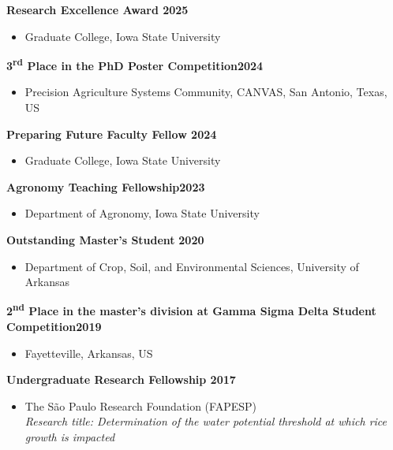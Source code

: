 \documentclass[letterpaper,10pt]{article}
\begin{document}
{\bf Research Excellence Award \hfill 2025}
\vspace{-.1in}
\begin{itemize}
\renewcommand\labelitemi{{\boldmath$\cdot$}}
\item Graduate College, Iowa State University
\end{itemize}

{\bf 3\textsuperscript{rd} Place in the PhD Poster
Competition}\hfill {\bf 2024} \vspace{-.1in}
\begin{itemize}
	\renewcommand\labelitemi{{\boldmath$\cdot$}}
	\item Precision Agriculture Systems
		Community, CANVAS, San Antonio,
		Texas, US 

\end{itemize}

{\bf Preparing Future Faculty Fellow \hfill 2024}
\vspace{-.1in}
\begin{itemize}
\renewcommand\labelitemi{{\boldmath$\cdot$}}
\item 
Graduate College,
Iowa State University
\end{itemize}

{\bf Agronomy Teaching Fellowship}\hfill {\bf 2023}
\vspace{-.1in}
\begin{itemize}
\renewcommand\labelitemi{{\boldmath$\cdot$}}
\item 
Department of Agronomy,
Iowa State University
\end{itemize}

{\bf Outstanding Master’s Student }\hfill {\bf
2020}
\vspace{-.1in}
\begin{itemize}
\renewcommand\labelitemi{{\boldmath$\cdot$}}
\item 
Department of Crop, Soil, and Environmental
Sciences,
University of Arkansas
\end{itemize}

{\bf 2\textsuperscript{nd} Place in the master’s
division at Gamma Sigma Delta Student Competition}\hfill {\bf 2019}
\vspace{-.1in}
\begin{itemize}
\renewcommand\labelitemi{{\boldmath$\cdot$}}
\item 

Fayetteville, Arkansas, US
\end{itemize}

{\bf Undergraduate Research Fellowship \hfill 2017}
\vspace{-.1in}
\begin{itemize}
\renewcommand\labelitemi{{\boldmath$\cdot$}}
\item 
The São Paulo Research Foundation (FAPESP) \\
\textit{Research title: Determination of the water potential threshold at which rice growth is impacted}

\end{itemize}
\end{document}
